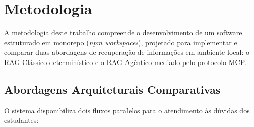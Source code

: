 \documentclass[12pt]{article}
\begin{document}
%
%
%

\section{Metodologia}\label{sec:metodologia}
A metodologia deste trabalho compreende o desenvolvimento de um software estruturado em monorepo (\textit{npm workspaces}), projetado para implementar e comparar duas abordagens de recuperação de informações em ambiente local: o RAG Clássico determinístico e o RAG Agêntico mediado pelo protocolo MCP.


\subsection{Abordagens Arquiteturais Comparativas}

O sistema disponibiliza dois fluxos paralelos para o atendimento às dúvidas dos estudantes:
\end{document}
